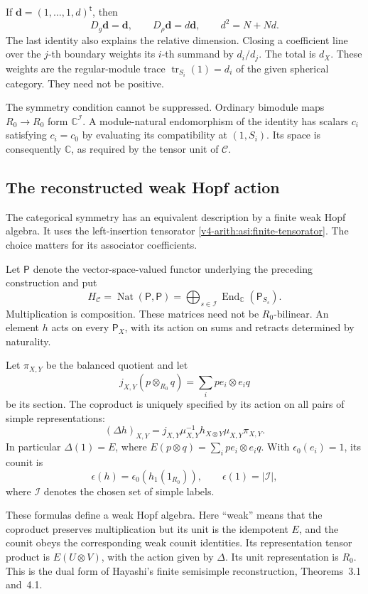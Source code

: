 If $\mathbf d=(1,\ldots,1,d)^{\mathsf t}$, then
\[
 D_g\mathbf d=\mathbf d,\qquad D_\rho\mathbf d=d\mathbf d,
 \qquad d^2=N+Nd.
\]
The last identity also explains the relative dimension. Closing a
coefficient line over the $j$-th boundary weights its $i$-th summand
by $d_i/d_j$. The total is $d_X$. These weights are the regular-module
trace $\operatorname{tr}_{S_i}(1)=d_i$ of the given spherical category.
They need not be positive.

The symmetry condition cannot be suppressed. Ordinary bimodule maps
$R_0\to R_0$ form $\mathbb C^{\mathcal I}$. A module-natural endomorphism of
the identity has scalars $c_i$ satisfying $c_i=c_0$ by evaluating its
compatibility at $(1,S_i)$. Its space is consequently $\mathbb C$,
as required by the tensor unit of $\mathcal C$.

\subsection{The reconstructed weak Hopf action}
\label{v4-arith:asi:weak-hopf}

The categorical symmetry has an equivalent description by a finite
weak Hopf algebra. It uses the left-insertion tensorator
\eqref{v4-arith:asi:finite-tensorator}. The choice matters for its
associator coefficients.

Let $\mathsf P$ denote the vector-space-valued functor underlying the
preceding construction and put
\[
 H_{\mathcal C}=\operatorname{Nat}(\mathsf P,\mathsf P)
       =\bigoplus_{s\in\mathcal I}\operatorname{End}_{\mathbb C}(\mathsf P_{S_s}).
\]
Multiplication is composition. These matrices need not be
\(R_0\)-bilinear. An element \(h\) acts on every
$\mathsf P_X$, with its action on sums and retracts determined by
naturality.

Let $\pi_{X,Y}$ be the balanced quotient and let
\[
 j_{X,Y}(p\otimes_{R_0}q)=\sum_i pe_i\otimes e_iq
\]
be its section. The coproduct is uniquely specified by its action on
all pairs of simple representations:
\begin{equation}\label{v4-arith:asi:weak-coproduct}
 (\Delta h)_{X,Y}
   =j_{X,Y}\mu_{X,Y}^{-1}h_{X\otimes Y}\mu_{X,Y}\pi_{X,Y}.
\end{equation}
In particular $\Delta(1)=E$, where
$E(p\otimes q)=\sum_i pe_i\otimes e_iq$.
With $\epsilon_0(e_i)=1$, its counit is
\[
 \epsilon(h)=\epsilon_0(h_1(1_{R_0})),\qquad
 \epsilon(1)=|\mathcal I|,
\]
where \(\mathcal I\) denotes the chosen set of simple labels.

These formulas define a weak Hopf algebra. Here ``weak'' means that
the coproduct preserves multiplication but its unit is the idempotent
$E$, and the counit obeys the corresponding weak counit identities.
Its representation tensor product is $E(U\otimes V)$, with the
action given by $\Delta$. Its unit representation is $R_0$.
This is the dual form of Hayashi's finite semisimple reconstruction,
Theorems~3.1 and~4.1.

